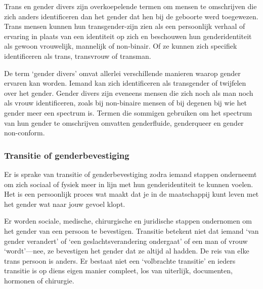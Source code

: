 \documentclass[12pt,openany]{book}
\begin{document}
Trans en gender divers zijn overkoepelende termen om mensen te omschrijven die zich anders identificeren dan het gender dat hen bij de geboorte werd toegewezen. Trans mensen kunnen hun transgender-zijn zien als een persoonlijk verhaal of ervaring in plaats van een identiteit op zich en beschouwen hun genderidentiteit als gewoon vrouwelijk, mannelijk of non-binair. Of ze kunnen zich specifiek identificeren als trans, transvrouw of transman.

De term `gender divers' omvat allerlei verschillende manieren waarop gender ervaren kan worden. Iemand kan zich identificeren als transgender of twijfelen over het gender. Gender divers zijn eveneens mensen die zich noch als man noch als vrouw identificeren, zoals bij non-binaire mensen of bij degenen bij wie het gender meer een spectrum is. Termen die sommigen gebruiken om het spectrum van hun gender te omschrijven omvatten genderfluide, genderqueer en gender non-conform. 

\begin{figure}[h]
    \centering
\end{figure}

\subsubsection*{Transitie of genderbevestiging}

Er is sprake van transitie of genderbevestiging zodra iemand stappen onderneemt om zich sociaal of fysiek meer in lijn met hun genderidentiteit te kunnen voelen. Het is een persoonlijk proces wat maakt dat je in de maatschappij kunt leven met het gender wat naar jouw gevoel klopt.

Er worden sociale, medische, chirurgische en juridische stappen ondernomen om het gender van een persoon te bevestigen. Transitie betekent niet dat iemand `van gender verandert' of `een geslachtsverandering ondergaat' of een man of vrouw `wordt'—nee, ze bevestigen het gender dat ze altijd al hadden. De reis van elke trans persoon is anders. Er bestaat niet een `volbrachte transitie' en ieders transitie is op diens eigen manier compleet, los van uiterlijk, documenten, hormonen of chirurgie.  
\end{document}
